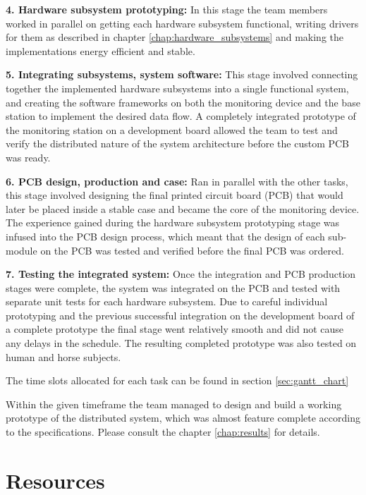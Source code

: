 \begin{description}
\item{\bfseries 4. Hardware subsystem prototyping:}
In this stage the team members worked in parallel on getting each hardware subsystem functional, writing drivers for them as described in chapter \ref{chap:hardware_subsystems} and making the implementations energy efficient and stable. 

\item{\bfseries 5. Integrating subsystems, system software:}
This stage involved connecting together the implemented hardware subsystems into a single functional system, and creating the 	software frameworks on both the monitoring device and the base station to implement the desired data flow. A completely integrated prototype of the monitoring station on a development board allowed the team to test and verify the distributed nature of the system architecture before the custom PCB was ready.

\item{\bfseries 6. PCB design, production and case:}
Ran in parallel with the other tasks, this stage involved designing the final printed circuit board (PCB) that would later be placed inside a stable case and became the core of the monitoring device. The experience gained during the hardware subsystem prototyping stage was infused into the PCB design process, which meant that the design of each sub-module on the PCB was tested and verified before the final PCB was ordered. 

\item{\bfseries 7. Testing the integrated system:}
Once the integration and PCB production stages were complete, the system was integrated on the PCB and tested with separate unit tests for each hardware subsystem.  Due to careful individual prototyping and the previous successful integration on the development board of a complete prototype the final stage went relatively smooth and did not cause any delays in the schedule. The resulting completed prototype was also tested on human and horse subjects.
\end{description}

The time slots allocated for each task can be found in section \ref{sec:gantt_chart}

Within the given timeframe the team managed to design and build a working prototype of the distributed system, which was almost feature complete according to the specifications. Please consult the chapter \ref{chap:results} for details.

\section{Resources}
